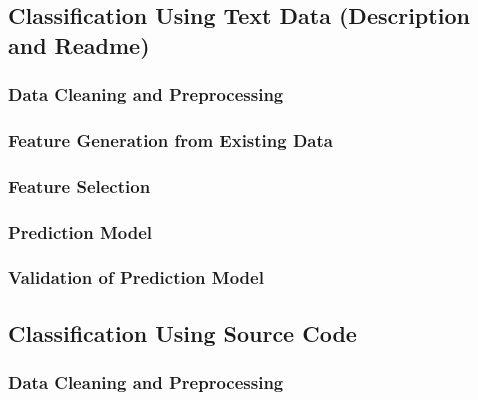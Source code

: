 \documentclass[%
a4paper,
DIV12,
2.5headlines,
bigheadings,
titlepage,
openbib,
]{scrartcl}
\begin{document}
\subsection{Classification Using Text Data (Description and
Readme)}\label{classification-using-text-data-description-and-readme}




\subsubsection{Data Cleaning and
Preprocessing}\label{data-cleaning-and-preprocessing-1}




\subsubsection{Feature Generation from Existing
Data}\label{feature-generation-from-existing-data}




\subsubsection{Feature Selection}\label{feature-selection-1}



\subsubsection{Prediction Model}\label{prediction-model-1}



\subsubsection{Validation of Prediction Model}\label{validation-of-prediction-model-1}



\subsection{Classification Using Source
Code}\label{classification-using-source-code}



\subsubsection{Data Cleaning and
Preprocessing}\label{data-cleaning-and-preprocessing-2}
\end{document}
